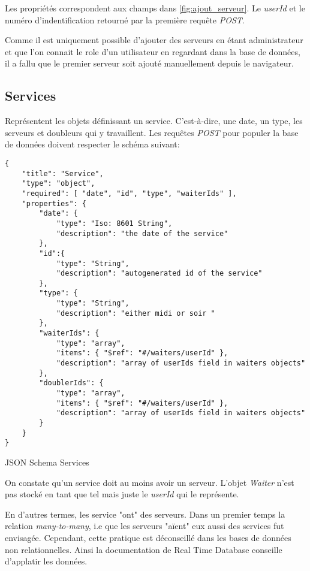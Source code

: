 Les propriétés correspondent aux champs dans \ref{fig:ajout_serveur}. Le \textit{userId} et le numéro d'indentification retourné par la première requête \textit{POST}.

Comme il est uniquement possible d'ajouter des serveurs en étant administrateur et que l'on connait le role d'un utilisateur en regardant dans la base de données, il a fallu que le premier serveur soit ajouté manuellement depuis le navigateur.
\newpage
\subsection*{Services}
Représentent les objets définissant un service. C'est-à-dire, une date, un type, les serveurs et doubleurs qui y travaillent. Les requêtes \textit{POST} pour populer la base de données doivent respecter le schéma suivant:

\begin{listing}[!h]
\begin{verbatim}
{
    "title": "Service",
    "type": "object",
    "required": [ "date", "id", "type", "waiterIds" ],
    "properties": {
        "date": {
            "type": "Iso: 8601 String",
            "description": "the date of the service"
        },
        "id":{
            "type": "String",
            "description": "autogenerated id of the service"
        },
        "type": {
            "type": "String",
            "description": "either midi or soir "
        },
        "waiterIds": {
            "type": "array",
            "items": { "$ref": "#/waiters/userId" },
            "description": "array of userIds field in waiters objects"
        },
        "doublerIds": {
            "type": "array",
            "items": { "$ref": "#/waiters/userId" },
            "description": "array of userIds field in waiters objects"
        }
    }
}
\end{verbatim}
\caption{JSON Schema Services}
\label{schema:services}
\end{listing}

On constate qu'un service doit au moins avoir un serveur. L'objet \textit{Waiter} n'est pas stocké en tant que tel mais juste le \textit{userId} qui le représente. 

En d'autres termes, les service "ont" des serveurs. Dans un premier temps la relation \textit{many-to-many}, i.e que les serveurs "aïent" eux aussi des services fut envisagée. Cependant, cette pratique est déconseillé dans les bases de données non relationnelles. Ainsi la documentation de Real Time Database conseille d'applatir les données. 
\newpage
